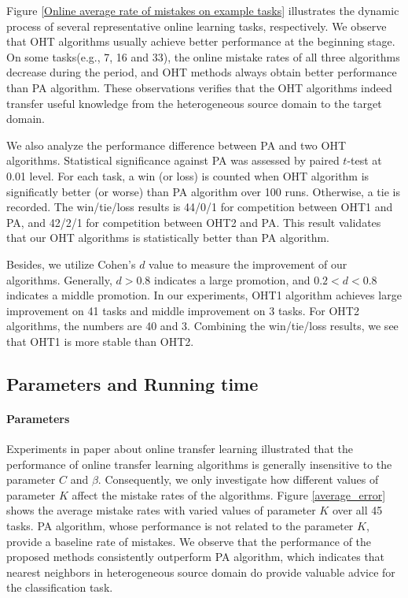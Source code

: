 \documentclass[letterpaper]{article}
\theoremstyle{remark}
\theoremstyle{definition}
\begin{document}
Figure \ref{Online average rate of mistakes on example tasks} illustrates the dynamic process of several representative online learning tasks, respectively.
We observe that OHT algorithms usually achieve better performance at the beginning stage.
On some tasks(e.g., 7, 16 and 33), the online mistake rates of all three algorithms decrease during the period, and OHT methods always obtain better performance than PA algorithm.
These observations verifies that the OHT algorithms indeed transfer useful knowledge from the heterogeneous source domain to the target domain. 

We also analyze the performance difference between PA and two OHT algorithms.
Statistical significance against PA was assessed by paired $t$-test at 0.01 level.
For each task, a win (or loss) is counted when OHT algorithm is significatly better (or worse) than PA algorithm over 100 runs.
Otherwise, a tie is recorded.
The win/tie/loss results is 44/0/1 for competition between OHT1 and PA, and 42/2/1 for competition between  OHT2 and PA.
This result validates that our OHT algorithms is statistically better than PA algorithm.

Besides, we utilize Cohen's $d$ value to measure the improvement of our algorithms.
Generally, $d>0.8$ indicates a large promotion, and $0.2<d<0.8$ indicates a middle promotion.
In our experiments, OHT1 algorithm achieves large improvement on 41 tasks and middle improvement on 3 tasks.
For OHT2 algorithms, the numbers are 40 and 3.
Combining the win/tie/loss results, we see that OHT1 is more stable than OHT2.


\subsection{Parameters and Running time}
\paragraph{Parameters}
Experiments in paper about online transfer learning illustrated that the performance of online transfer learning algorithms is generally insensitive to the parameter $C$ and $\beta$.
Consequently, we only investigate how different values of parameter $K$ affect the mistake rates of the algorithms.
Figure \ref{average_error} shows the average mistake rates with varied values of parameter $K$ over all 45 tasks.
PA algorithm, whose performance is not related to the parameter $K$, provide a baseline rate of mistakes.
We observe that the performance of the proposed methods consistently outperform PA algorithm, which indicates that nearest neighbors in heterogeneous source domain do provide valuable advice for the classification task.
\end{document}
